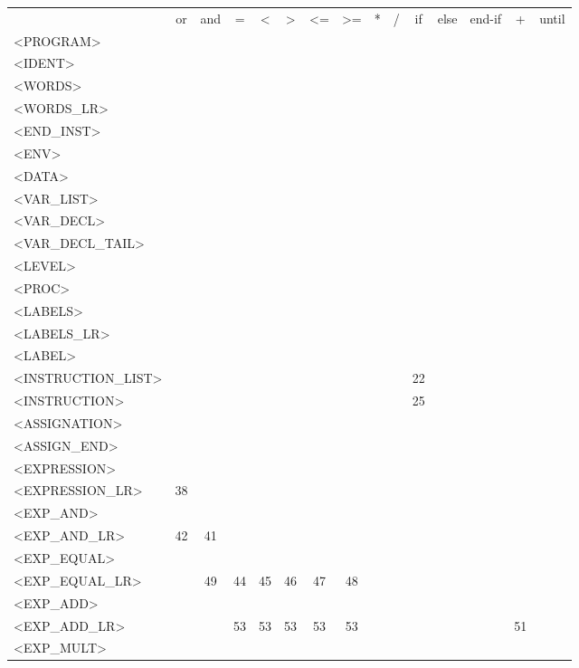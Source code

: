 \documentclass[a4paper,11pt]{article}
\begin{document}
\newpage
\begin{longtable}{l||cccccccccccccc}
	& or & and & = & < & > & <= & >= & * & / & if & else & end-if & + & until\\
	<PROGRAM> & & & & & & & & & & & & & & \\
	<IDENT> & & & & & & & & & & & & & & \\
	<WORDS>  & & & & & & & & & & & & & & \\
	<WORDS\_LR>  & & & & & & & & & & & & & & \\
	<END\_INST> & & & & & & & & & & & & & & \\
	<ENV> & & & & & & & & & & & & & & \\
	<DATA>  & & & & & & & & & & & & & & \\
	<VAR\_LIST> & & & & & & & & & & & & & & \\
	<VAR\_DECL>  & & & & & & & & & & & & & & \\
	<VAR\_DECL\_TAIL> & & & & & & & & & & & & & & \\
	<LEVEL> & & & & & & & & & & & & & & \\
	<PROC> & & & & & & & & & & & & & & \\
	<LABELS> & & & & & & & & & & & & & & \\
	<LABELS\_LR>  & & & & & & & & & & & & & & \\
	<LABEL>  & & & & & & & & & & & & & & \\
	<INSTRUCTION\_LIST> & & & & & & & & & & 22 & & & & \\
	<INSTRUCTION> & & & & & & & & & & 25 & & & & \\
	<ASSIGNATION> & & & & & & & & & & & & & & \\
	<ASSIGN\_END> & & & & & & & & & & & & & & \\
	<EXPRESSION>  & & & & & & & & & & & & & & \\
	<EXPRESSION\_LR> & 38 & & & & & & & & & & & & & \\
	<EXP\_AND>  & & & & & & & & & & & & &  &\\
	<EXP\_AND\_LR> & 42 & 41 & & & & & & & & & & & & \\
	<EXP\_EQUAL>  & & & & & & & & & & & & & & \\
	<EXP\_EQUAL\_LR> & & 49 & 44 & 45 & 46 & 47 & 48 & & & & & & & \\
	<EXP\_ADD>  & & & & & & & & & & & & & \\
	<EXP\_ADD\_LR> & & & 53 & 53 & 53 & 53 & 53 & & & & & & 51 & \\
	<EXP\_MULT>  & & & & & & & & & & & & & & \\

\end{longtable}
\end{document}
